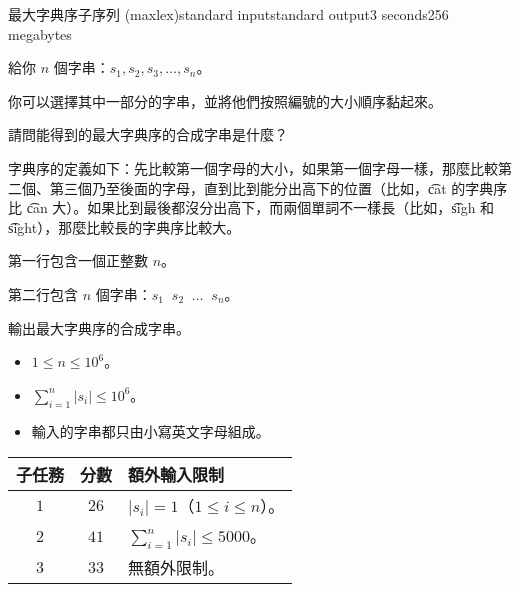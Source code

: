 \begin{problem}{最大字典序子序列 (maxlex)}{standard input}{standard output}{3 seconds}{256 megabytes}

給你 $n$ 個字串：$s_1, s_2, s_3, \ldots, s_n$。

你可以選擇其中一部分的字串，並將他們按照編號的大小順序黏起來。

請問能得到的最大字典序的合成字串是什麼？

字典序的定義如下：先比較第一個字母的大小，如果第一個字母一樣，那麼比較第二個、第三個乃至後面的字母，直到比到能分出高下的位置（比如，\t{cat} 的字典序比 \t{can} 大）。如果比到最後都沒分出高下，而兩個單詞不一樣長（比如，\t{sigh} 和 \t{sight}），那麼比較長的字典序比較大。


\InputFile
第一行包含一個正整數 $n$。

第二行包含 $n$ 個字串：$s_1 \;\; s_2 \;\; \ldots \;\; s_n$。


\OutputFile
輸出最大字典序的合成字串。


\Scoring
\begin{itemize}
  \item $1 \le n \le 10^6$。
  \item $\sum_{i=1}^n |s_i| \le 10^6$。
  \item 輸入的字串都只由小寫英文字母組成。
\end{itemize}

\begin{center}
\begin{tabular}{ccl} \hline
  \bf{子任務} & \bf{分數} & \bf{額外輸入限制} \\ \hline
  $1$ & $26$ & $|s_i| = 1$（$1 \le i \le n$）。 \\
  $2$ & $41$ & $\sum_{i=1}^n |s_i| \le 5000$。 \\
  $3$ & $33$ & 無額外限制。 \\
\hline \end{tabular}
\end{center}


\Examples

\begin{example}
%
%
\end{example}

\end{problem}


